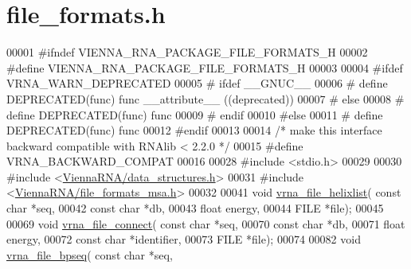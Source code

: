 \hypertarget{file__formats_8h_source}{}\section{file\+\_\+formats.\+h}
\label{file__formats_8h_source}

\begin{DoxyCode}
00001 \textcolor{preprocessor}{#ifndef VIENNA\_RNA\_PACKAGE\_FILE\_FORMATS\_H}
00002 \textcolor{preprocessor}{#define VIENNA\_RNA\_PACKAGE\_FILE\_FORMATS\_H}
00003 
00004 \textcolor{preprocessor}{#ifdef VRNA\_WARN\_DEPRECATED}
00005 \textcolor{preprocessor}{# ifdef \_\_GNUC\_\_}
00006 \textcolor{preprocessor}{#  define DEPRECATED(func) func \_\_attribute\_\_ ((deprecated))}
00007 \textcolor{preprocessor}{# else}
00008 \textcolor{preprocessor}{#  define DEPRECATED(func) func}
00009 \textcolor{preprocessor}{# endif}
00010 \textcolor{preprocessor}{#else}
00011 \textcolor{preprocessor}{# define DEPRECATED(func) func}
00012 \textcolor{preprocessor}{#endif}
00013 
00014 \textcolor{comment}{/* make this interface backward compatible with RNAlib < 2.2.0 */}
00015 \textcolor{preprocessor}{#define VRNA\_BACKWARD\_COMPAT}
00016 
00028 \textcolor{preprocessor}{#include <stdio.h>}
00029 
00030 \textcolor{preprocessor}{#include <\hyperlink{data__structures_8h}{ViennaRNA/data\_structures.h}>}
00031 \textcolor{preprocessor}{#include <\hyperlink{file__formats__msa_8h}{ViennaRNA/file\_formats\_msa.h}>}
00032 
00041 \textcolor{keywordtype}{void} \hyperlink{group__file__utils_gaaface7db12fadc3d271641c4515ab6e4}{vrna\_file\_helixlist}( \textcolor{keyword}{const} \textcolor{keywordtype}{char} *seq,
00042                           \textcolor{keyword}{const} \textcolor{keywordtype}{char} *db,
00043                           \textcolor{keywordtype}{float} energy,
00044                           FILE *file);
00045 
00069 \textcolor{keywordtype}{void} \hyperlink{group__file__utils_gab69682373ccca1e0e28cc967eec07745}{vrna\_file\_connect}( \textcolor{keyword}{const} \textcolor{keywordtype}{char} *seq,
00070                         \textcolor{keyword}{const} \textcolor{keywordtype}{char} *db,
00071                         \textcolor{keywordtype}{float} energy,
00072                         \textcolor{keyword}{const} \textcolor{keywordtype}{char} *identifier,
00073                         FILE *file);
00074 
00082 \textcolor{keywordtype}{void} \hyperlink{group__file__utils_ga9b462e6f202594af5d3fa56e280d633f}{vrna\_file\_bpseq}( \textcolor{keyword}{const} \textcolor{keywordtype}{char} *seq,

\end{DoxyCode}
